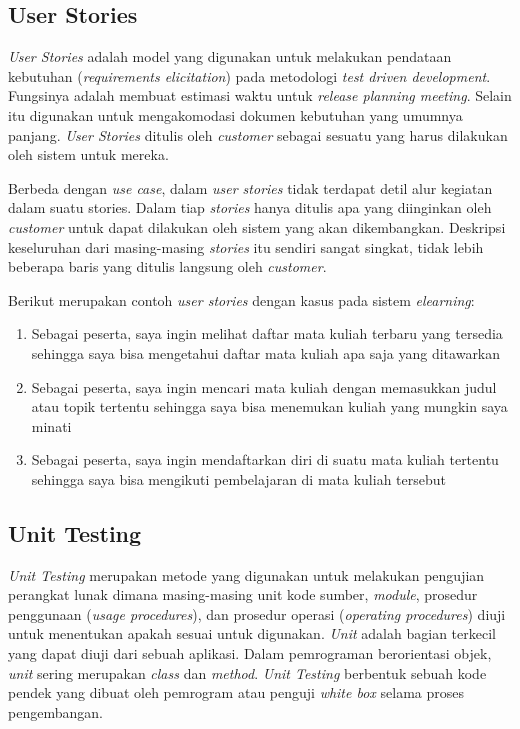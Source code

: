 \begin{spacing}{2}
  \subsection{User Stories}
    \emph{User Stories} adalah model yang digunakan untuk melakukan pendataan kebutuhan (\emph{requirements elicitation}) pada metodologi \emph{test driven development}. Fungsinya adalah membuat estimasi waktu untuk \emph{release planning meeting}. Selain itu digunakan untuk mengakomodasi dokumen kebutuhan yang umumnya panjang. \emph{User Stories} ditulis oleh \emph{customer} sebagai sesuatu yang harus dilakukan oleh sistem untuk mereka.

    Berbeda dengan \emph{use case}, dalam \emph{user stories} tidak terdapat detil alur kegiatan dalam suatu stories. Dalam tiap \emph{stories} hanya ditulis apa yang diinginkan oleh \emph{customer} untuk dapat dilakukan oleh sistem yang akan dikembangkan. Deskripsi keseluruhan dari masing-masing \emph{stories} itu sendiri sangat singkat, tidak lebih beberapa baris yang ditulis langsung oleh \emph{customer}.

    Berikut merupakan contoh \emph{user stories} dengan kasus pada sistem \emph{elearning}:
    \begin{enumerate}
      \item Sebagai peserta, saya ingin melihat daftar mata kuliah terbaru yang tersedia sehingga saya bisa mengetahui daftar mata kuliah apa saja yang ditawarkan
      \item Sebagai peserta, saya ingin mencari mata kuliah dengan memasukkan judul atau topik tertentu sehingga saya bisa menemukan kuliah yang mungkin saya minati
      \item Sebagai peserta, saya ingin mendaftarkan diri di suatu mata kuliah tertentu sehingga saya bisa mengikuti pembelajaran di mata kuliah tersebut
    \end{enumerate}

  \subsection{Unit Testing}
    \emph{Unit Testing} merupakan metode yang digunakan untuk melakukan pengujian perangkat lunak dimana masing-masing unit kode sumber, \emph{module}, prosedur penggunaan (\emph{usage procedures}), dan prosedur operasi (\emph{operating procedures}) diuji untuk menentukan apakah sesuai untuk digunakan. \emph{Unit} adalah bagian terkecil yang dapat diuji dari sebuah aplikasi. Dalam pemrograman berorientasi objek, \emph{unit} sering merupakan \emph{class} dan \emph{method}. \emph{Unit Testing} berbentuk sebuah kode pendek yang dibuat oleh pemrogram atau penguji \emph{white box} selama proses pengembangan.

\end{spacing}
\begin{comment}

\end{comment}
